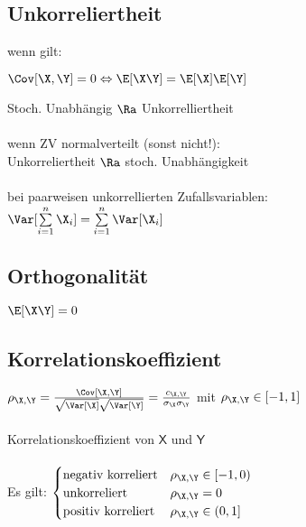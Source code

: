 \documentclass[german,color,6pt]{latex4ei/latex4ei_sheet}
\begin{document}
\begin{sectionbox}
	\subsection{Unkorreliertheit}
	wenn gilt:
	\begin{emphbox}
		$\Cov [\X,\Y] = 0 \Leftrightarrow \E[\X\Y] = \E[\X] \E[\Y]$
	\end{emphbox}
	Stoch. Unabhängig $\Ra$ Unkorrelliertheit \\\\
	wenn ZV normalverteilt (sonst nicht!):\\
	Unkorreliertheit $\Ra$ stoch. Unabhängigkeit\\\\
	bei paarweisen unkorrellierten Zufallsvariablen:\\
	$\Var[\sum \limits_{i=1}^{n} \X_i] = \sum \limits_{i=1}^{n} \Var [\X_i]$
\end{sectionbox}

\begin{sectionbox}
	\subsection{Orthogonalität}
	
	\begin{emphbox}
		$\E[\X\Y] = 0$
	\end{emphbox}
	
\end{sectionbox}

\begin{sectionbox}
	\subsection{Korrelationskoeffizient}
	$\rho_{\X,\Y} = \frac{\Cov[\X,\Y]}{\sqrt{\Var[\X]} \sqrt{\Var[\Y]}} = \frac{c_{\X,\Y}}{\sigma_{\X} \sigma_{\Y}}$ mit $\rho_{\X, \Y} \in [-1,1]$\\ \\
	Korrelationskoeffizient von $\mathsf X$ und $\mathsf Y$\\\\
	Es gilt: $\begin{cases}\text{negativ korreliert} & \rho_{\mathsf{\X,\Y}}\in [-1,0) \\ 
	\text{unkorreliert} & \rho_{\mathsf{\X,\Y}}=0 \\ 
	\text{positiv korreliert} & \rho_{\mathsf{\X,\Y}}\in (0,1]\end{cases}$
\end{sectionbox}
\end{document}
